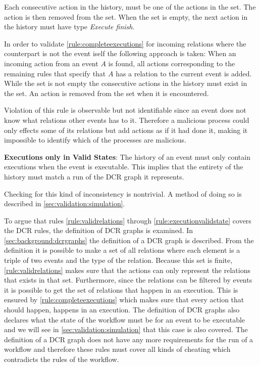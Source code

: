 	Each consecutive action in the history, must be one of the actions in the set. The action is then removed from the set. When the set is empty, the next action in the history must have type \textit{Execute finish}.
	
	\newpar In order to validate \autoref{rule:completeexecutions} for incoming relations where the counterpart is not the event iself the following approach is taken: When an incoming action from an event $A$ is found, all actions corresponding to the remaining rules that specify that $A$ has a relation to the current event is added. While the set is not empty the consecutive actions in the history must exist in the set. An action is removed from the set when it is encountered.
	
	\newpar Violation of this rule is observable but not identifiable since an event does not know what relations other events has to it. Therefore a malicious process could only effects some of its relations but add actions as if it had done it, making it impossible to identify which of the processes are malicious.

	\begin{ruledef}
		\textbf{Executions only in Valid States}: The history of an event must only contain executions when the event is executable. This implies that the entirety of the history must match a run of the DCR graph it represents.
		\label{rule:executionvalidstate}
	\end{ruledef}
	
	\noindent Checking for this kind of inconsistency is nontrivial. A method of doing so is described in \autoref{sec:validation:simulation}.
	
	\newpar To argue that rules \ref{rule:validrelations} through \ref{rule:executionvalidstate} covers the DCR rules, the definition of DCR graphs is examined. In \autoref{sec:background:dcrgraphs} the definition of a DCR graph is described. From the definition it is possible to make a set of all relations where each element is a triple of two events and the type of the relation. Because this set is finite, \autoref{rule:validrelations} makes sure that the actions can only represent the relations that exists in that set. Furthermore, since the relations can be filtered by events it is possible to get the set of relations that happen in an execution. This is ensured by \autoref{rule:completeexecutions} which makes sure that every action that should happen, happens in an execution. The definition of DCR graphs also declares what the state of the workflow must be for an event to be executable and we will see in \autoref{sec:validation:simulation} that this case is also covered. The definition of a DCR graph does not have any more requirements for the run of a workflow and therefore these rules must cover all kinds of cheating which contradicts the rules of the workflow.
	
